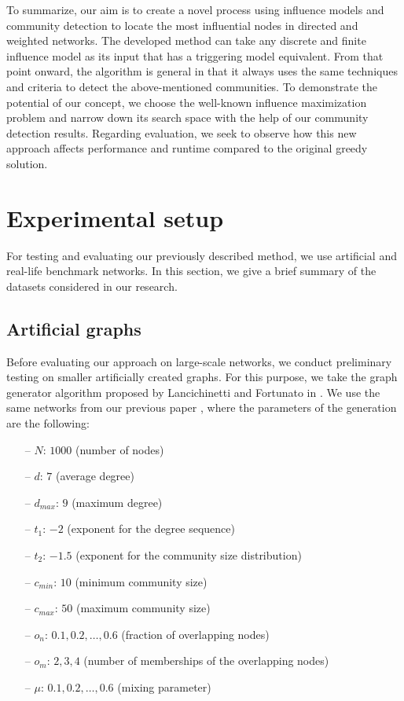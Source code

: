 \documentclass[pdflatex,sn-mathphys-num]{sn-jnl}
\begin{document}
To summarize, our aim is to create a novel process using influence models and community detection to locate the most influential nodes in directed and weighted networks. The developed method can take any discrete and finite influence model as its input that has a triggering model equivalent. From that point onward, the algorithm is general in that it always uses the same techniques and criteria to detect the above-mentioned communities. To demonstrate the potential of our concept, we choose the well-known influence maximization problem and narrow down its search space with the help of our community detection results. Regarding evaluation, we seek to observe how this new approach affects performance and runtime compared to the original greedy solution.


\section{Experimental setup}\label{sec_setup}

For testing and evaluating our previously described method, we use artificial and real-life benchmark networks. In this section, we give a brief summary of the datasets considered in our research.


\subsection{Artificial graphs}\label{subsec_artificial}

Before evaluating our approach on large-scale networks, we conduct preliminary testing on smaller artificially created graphs. For this purpose, we take the graph generator algorithm proposed by Lancichinetti and Fortunato in \cite{fortunato}. We use the same networks from our previous paper \cite{evaluating}, where the parameters of the generation are the following:

\begin{itemize}
    \item[--] $N$: $1000$ (number of nodes)
    \item[--] $d$: $7$ (average degree)
    \item[--] $d_{max}$: $9$ (maximum degree)
    \item[--] $t_1$: $-2$ (exponent for the degree sequence)
    \item[--] $t_2$: $-1.5$ (exponent for the community size distribution)
    \item[--] $c_{min}$: $10$ (minimum community size)
    \item[--] $c_{max}$: $50$ (maximum community size)
    \item[--] $o_n$: $0.1, 0.2, \dots, 0.6$ (fraction of overlapping nodes)
    \item[--] $o_m$: $2, 3, 4$ (number of memberships of the overlapping nodes)
    \item[--] $\mu$: $0.1, 0.2, \dots, 0.6$ (mixing parameter)
\end{itemize}
\end{document}
